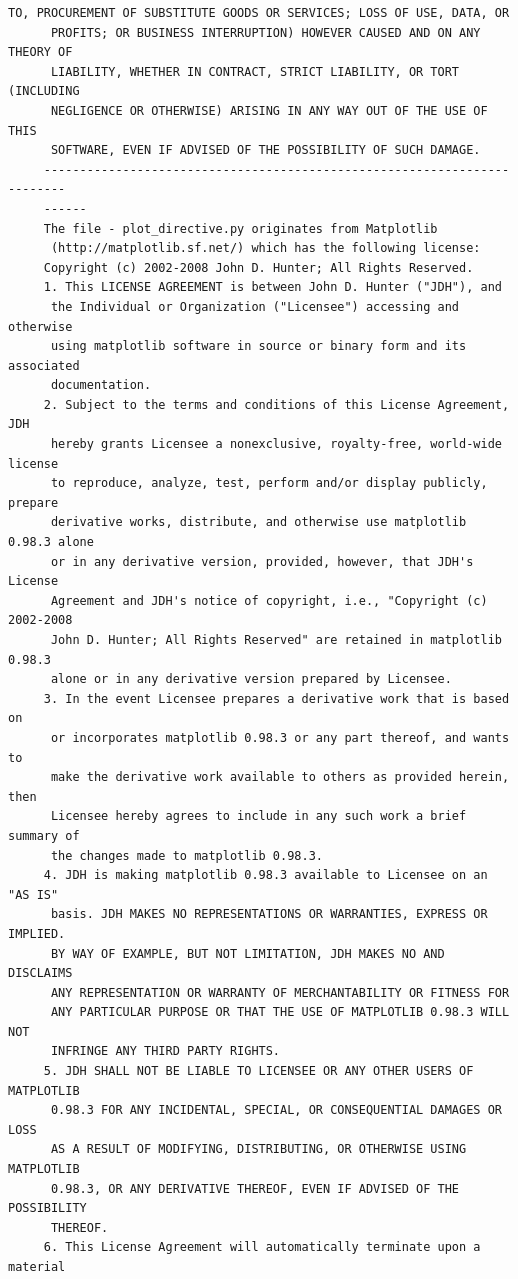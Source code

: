 \begin{lstlisting}[basicstyle=\ttfamily\footnotesize,breaklines=true]
      TO, PROCUREMENT OF SUBSTITUTE GOODS OR SERVICES; LOSS OF USE, DATA, OR
      PROFITS; OR BUSINESS INTERRUPTION) HOWEVER CAUSED AND ON ANY THEORY OF
      LIABILITY, WHETHER IN CONTRACT, STRICT LIABILITY, OR TORT (INCLUDING
      NEGLIGENCE OR OTHERWISE) ARISING IN ANY WAY OUT OF THE USE OF THIS
      SOFTWARE, EVEN IF ADVISED OF THE POSSIBILITY OF SUCH DAMAGE.
     -------------------------------------------------------------------------
     ------
     The file - plot_directive.py originates from Matplotlib
      (http://matplotlib.sf.net/) which has the following license:
     Copyright (c) 2002-2008 John D. Hunter; All Rights Reserved.
     1. This LICENSE AGREEMENT is between John D. Hunter ("JDH"), and
      the Individual or Organization ("Licensee") accessing and otherwise
      using matplotlib software in source or binary form and its associated
      documentation.
     2. Subject to the terms and conditions of this License Agreement, JDH
      hereby grants Licensee a nonexclusive, royalty-free, world-wide license
      to reproduce, analyze, test, perform and/or display publicly, prepare
      derivative works, distribute, and otherwise use matplotlib 0.98.3 alone
      or in any derivative version, provided, however, that JDH's License
      Agreement and JDH's notice of copyright, i.e., "Copyright (c) 2002-2008
      John D. Hunter; All Rights Reserved" are retained in matplotlib 0.98.3
      alone or in any derivative version prepared by Licensee.
     3. In the event Licensee prepares a derivative work that is based on
      or incorporates matplotlib 0.98.3 or any part thereof, and wants to
      make the derivative work available to others as provided herein, then
      Licensee hereby agrees to include in any such work a brief summary of
      the changes made to matplotlib 0.98.3.
     4. JDH is making matplotlib 0.98.3 available to Licensee on an "AS IS"
      basis. JDH MAKES NO REPRESENTATIONS OR WARRANTIES, EXPRESS OR IMPLIED.
      BY WAY OF EXAMPLE, BUT NOT LIMITATION, JDH MAKES NO AND DISCLAIMS
      ANY REPRESENTATION OR WARRANTY OF MERCHANTABILITY OR FITNESS FOR
      ANY PARTICULAR PURPOSE OR THAT THE USE OF MATPLOTLIB 0.98.3 WILL NOT
      INFRINGE ANY THIRD PARTY RIGHTS.
     5. JDH SHALL NOT BE LIABLE TO LICENSEE OR ANY OTHER USERS OF MATPLOTLIB
      0.98.3 FOR ANY INCIDENTAL, SPECIAL, OR CONSEQUENTIAL DAMAGES OR LOSS
      AS A RESULT OF MODIFYING, DISTRIBUTING, OR OTHERWISE USING MATPLOTLIB
      0.98.3, OR ANY DERIVATIVE THEREOF, EVEN IF ADVISED OF THE POSSIBILITY
      THEREOF.
     6. This License Agreement will automatically terminate upon a material

\end{lstlisting}
